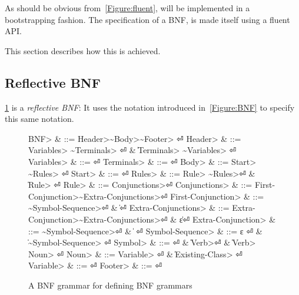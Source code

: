 As should be obvious from~\cref{Figure:fluent}, \Self will be implemented
  in a bootstrapping fashion.
The specification of a BNF, is made itself using a fluent API.

This section describes how this is achieved.

\subsection{Reflective BNF}
\cref{Figure:BNF:BNF} is a \emph{reflective BNF}:
It uses the notation introduced in~\cref{Figure:BNF}
  to specify this same notation.

\begin{figure}[H]
  \begin{Grammar}
    \begin{aligned}
      \<BNF>                     & ::= \<Header>\~\<Body>\~\<Footer> \hfill⏎
      \<Header>                  & ::= \<Variables> \~\<Terminals> \hfill⏎
      {}                         & \| \<Terminals> \~\<Variables> \hfill⏎
      \<Variables>               & ::= \hfill⏎
      \<Terminals>               & ::= \hfill⏎
      \<Body>                    & ::= \<Start> \~\<Rules> \hfill⏎
      \<Start>                   & ::=  \hfill⏎
      \<Rules>                   & ::= \<Rule> \~\<Rules>\hfill⏎
      {}                         & \| \<Rule> \hfill⏎
      \<Rule>                    & ::=  \<Conjunctions>\hfill⏎
      \<Conjunctions>            & ::= \<First-Conjunction>\~\<Extra-Conjunctions>\hfill⏎
      \<First-Conjunction>       & ::= \~\<Symbol-Sequence>\hfill⏎
      {}                         & \| \hfill⏎
      \<Extra-Conjunctions> & ::= \<Extra-Conjunction>\~\<Extra-Conjunctions>\hfill⏎
      {}                         & \| ε\hfill⏎
      \<Extra-Conjunction>  & ::= \~\<Symbol-Sequence>\hfill⏎
      {}                         & \|  \hfill⏎
      \<Symbol-Sequence>         & ::= ε \hfill⏎
      {}                         & \| \~\<Symbol-Sequence> \hfill⏎
      \<Symbol>                  & ::=  \hfill⏎
      {}                         & \| \<Verb>\hfill⏎
      {}                         & \| \<Verb> \cc{,} \<Noun> \hfill⏎
      \<Noun>                    & ::= \<Variable> \hfill⏎
      {}                         & \| \<Existing-Class> \hfill⏎
      \<Variable>                & ::=  \hfill⏎
      \<Footer>                  & ::= \hfill⏎
    \end{aligned}
  \end{Grammar}
  \caption{A BNF grammar for defining BNF grammars}
  \label{Figure:BNF:BNF}
\end{figure}
\begin{comment}
Note that this specification can only be approximate;
the figure uses verbs as replacement to indentation,
and special symbols such as~$|$,~$::-$ and~$ε$.
\end{comment}

